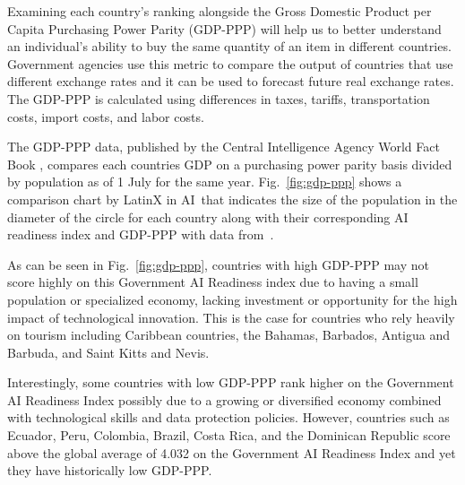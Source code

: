 \documentclass[conference]{IEEEtran}
\begin{document}
Examining each country's ranking alongside the Gross Domestic Product per Capita Purchasing Power Parity (GDP-PPP) will help us to better understand an individual's ability to buy the same quantity of an item in different countries. Government agencies use this metric to compare the output of countries that use different exchange rates and it can be used to forecast future real exchange rates. The GDP-PPP is calculated using differences in taxes, tariffs, transportation costs, import costs, and labor costs.

The GDP-PPP data, published by the Central Intelligence Agency World Fact Book \cite{central2019world}, compares each countries GDP on a purchasing power parity basis divided by population as of 1 July for the same year. Fig.~\ref{fig:gdp-ppp} shows a comparison chart by LatinX in AI\texttrademark~that indicates the size of the population in the diameter of the circle for each country along with their corresponding AI readiness index and GDP-PPP with data from~\cite{central2019world,miller2019government}.

As can be seen in  Fig.~\ref{fig:gdp-ppp}, countries with high GDP-PPP may not score highly on this Government AI Readiness index due to having a small population or specialized economy, lacking investment or opportunity for the high impact of technological innovation. This is the case for countries who rely heavily on tourism including Caribbean countries, the Bahamas, Barbados, Antigua and Barbuda, and Saint Kitts and Nevis.

Interestingly, some countries with low GDP-PPP rank higher on the Government AI Readiness Index possibly due to a growing or diversified economy combined with technological skills and data protection policies. However, countries such as Ecuador, Peru, Colombia, Brazil, Costa Rica, and the Dominican Republic score above the global average of 4.032 on the Government AI Readiness Index and yet they have historically low GDP-PPP.
\end{document}
